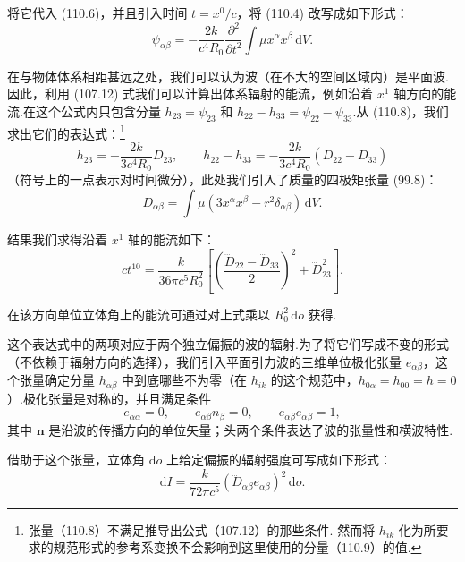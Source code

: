 将它代入 (110.6)，并且引入时间 $t=x^{0}/c$，将 (110.4) 改写成如下形式：
\begin{equation}
  \psi_{\alpha\beta}=-\frac{2k}{c^{4}R_0}
  \frac{\partial^{2}}{\partial t^{2}}
  \int\mu x^{\alpha}x^{\beta}\,\mathrm{d}V.
\end{equation}

在与物体体系相距甚远之处，我们可以认为波（在不大的空间区域内）是平面波.因此，利用 (107.12) 式我们可以计算出体系辐射的能流，例如沿着 $x^{1}$ 轴方向的能流.在这个公式内只包含分量 $h_{23}=\psi_{23}$ 和 $h_{22}-h_{33}=\psi_{22}-\psi_{33}$.从 (110.8)，我们求出它们的表达式：\footnote{张量（110.8）不满足推导出公式（107.12）的那些条件. 然而将 $h_{ik}$ 化为所要求的规范形式的参考系变换不会影响到这里使用的分量（110.9）的值.}
\begin{equation}
  h_{23}=-\frac{2k}{3c^{4}R_0}\ddot{D}_{23},
  \qquad
  h_{22}-h_{33}
  =-\frac{2k}{3c^{4}R_0}(\ddot{D}_{22}-\ddot{D}_{33})
\end{equation}
（符号上的一点表示对时间微分），此处我们引入了质量的四极矩张量 (99.8)：
\begin{equation}
  D_{\alpha\beta}
  =\int\mu(3x^{\alpha}x^{\beta}-r^{2}\delta_{\alpha\beta})\,\mathrm{d}V.
\end{equation}

结果我们求得沿着 $x^{1}$ 轴的能流如下：
\begin{equation}
  ct^{10}=\frac{k}{36\pi c^{5}R_0^{2}}
  \left[\left(\frac{\dddot{D}_{22}-\dddot{D}_{33}}{2}\right)^{2}
  +\dddot{D}_{23}^{2}\right].
\end{equation}

在该方向单位立体角上的能流可通过对上式乘以 $R_0^{2}\,\mathrm{d}o$ 获得.

这个表达式中的两项对应于两个独立偏振的波的辐射.为了将它们写成不变的形式（不依赖于辐射方向的选择），我们引入平面引力波的三维单位极化张量 $e_{\alpha\beta}$，这个张量确定分量 $h_{\alpha\beta}$ 中到底哪些不为零（在 $h_{ik}$ 的这个规范中，$h_{0\alpha}=h_{00}=h=0$）.极化张量是对称的，并且满足条件
\begin{equation}
  e_{\alpha\alpha}=0,\qquad
  e_{\alpha\beta}n_{\beta}=0,\qquad
  e_{\alpha\beta}e_{\alpha\beta}=1,
\end{equation}
其中 $\boldsymbol{n}$ 是沿波的传播方向的单位矢量；头两个条件表达了波的张量性和横波特性.

借助于这个张量，立体角 $\mathrm{d}o$ 上给定偏振的辐射强度可写成如下形式：
\begin{equation}
  \mathrm{d}I=\frac{k}{72\pi c^{5}}
  (\dddot{D}_{\alpha\beta}e_{\alpha\beta})^{2}\,\mathrm{d}o.
\end{equation}

